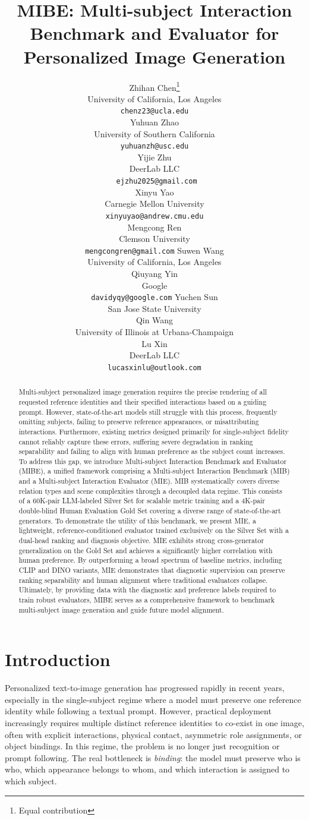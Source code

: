 \documentclass{article}
\title{MIBE: Multi-subject Interaction Benchmark and Evaluator for Personalized Image Generation}
\author{%
    Zhihan Chen\thanks{Equal contribution}\\
    University of California, Los Angeles\\
    \texttt{chenz23@ucla.edu}\\
    \AND
    Yuhuan Zhao\footnotemark[1]\\
    University of Southern California\\
    \texttt{yuhuanzh@usc.edu}\\
    \AND
    Yijie Zhu\footnotemark[1]\\
    DeerLab LLC\\
    \texttt{ ejzhu2025@gmail.com}\\
    \AND
    Xinyu Yao\footnotemark[1] \\
    Carnegie Mellon University\\
    \texttt{xinyuyao@andrew.cmu.edu} \\
    \AND
    Mengcong Ren\\
    Clemson University\\
    \texttt{mengcongren@gmail.com}
    \AND
    Suwen Wang\\
    University of California, Los Angeles\\
    \AND
    Qiuyang Yin\\
    Google\\
    \texttt{davidyqy@google.com}
    \AND
    Yuchen Sun\\
    San Jose State University\\
    \AND
    Qin Wang\\
    University of Illinois at Urbana-Champaign\\
    \AND 
    Lu Xin\\
    DeerLab LLC\\
    \texttt{lucasxinlu@outlook.com}
}
\begin{document}
\maketitle


\begin{abstract}
Multi-subject personalized image generation requires the precise rendering of all requested reference identities and their specified interactions based on a guiding prompt. However, state-of-the-art models still struggle with this process, frequently omitting subjects, failing to preserve reference appearances, or misattributing interactions. Furthermore, existing metrics designed primarily for single-subject fidelity cannot reliably capture these errors, suffering severe degradation in ranking separability and failing to align with human preference as the subject count increases. To address this gap, we introduce Multi-subject Interaction Benchmark and Evaluator (MIBE), a unified framework comprising a Multi-subject Interaction Benchmark (MIB) and a Multi-subject Interaction Evaluator (MIE). MIB systematically covers diverse relation types and scene complexities through a decoupled data regime. This consists of a 60K-pair LLM-labeled Silver Set for scalable metric training and a 4K-pair double-blind Human Evaluation Gold Set covering a diverse range of state-of-the-art generators. To demonstrate the utility of this benchmark, we present MIE, a lightweight, reference-conditioned evaluator trained exclusively on the Silver Set with a dual-head ranking and diagnosis objective. MIE exhibits strong cross-generator generalization on the Gold Set and achieves a significantly higher correlation with human preference. By outperforming a broad spectrum of baseline metrics, including CLIP and DINO variants, MIE demonstrates that diagnostic supervision can preserve ranking separability and human alignment where traditional evaluators collapse. Ultimately, by providing data with the diagnostic and preference labels required to train robust evaluators, MIBE serves as a comprehensive framework to benchmark multi-subject image generation and guide future model alignment.
\end{abstract}



\section{Introduction}
Personalized text-to-image generation has progressed rapidly in recent years, especially in the single-subject regime where a model must preserve one reference identity while following a textual prompt. However, practical deployment increasingly requires multiple distinct reference identities to co-exist in one image, often with explicit interactions, physical contact, asymmetric role assignments, or object bindings. In this regime, the problem is no longer just recognition or prompt following. The real bottleneck is \emph{binding}: the model must preserve who is who, which appearance belongs to whom, and which interaction is assigned to which subject.
\end{document}
